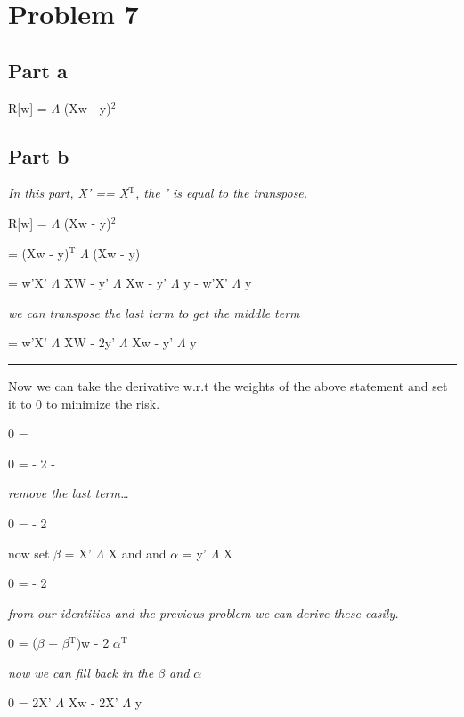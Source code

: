\documentclass[11pt]{article}
\begin{document}
\section{Problem 7}
\label{sec-7}
\subsection{Part a}
\label{sec-7-1}

R[w] = $\Lambda$ (Xw - y)$^{\text{2}}$

\subsection{Part b}
\label{sec-7-2}
\emph{In this part, X' == X$^{\text{T}}$, the ' is equal to the transpose.}

R[w] = $\Lambda$ (Xw - y)$^{\text{2}}$

= (Xw - y)$^{\text{T}}$ $\Lambda$ (Xw - y)

= w'X' $\Lambda$ XW - y' $\Lambda$ Xw - y' $\Lambda$ y - w'X' $\Lambda$ y

\emph{we can transpose the last term to get the middle term}

= w'X' $\Lambda$ XW - 2y' $\Lambda$ Xw - y' $\Lambda$ y

\rule{\linewidth}{0.5pt}
Now we can take the derivative w.r.t the weights of the above statement and set it to 0 to minimize the risk.

0 = 

0 =  - 2  - 

\emph{remove the last term\ldots{}}

0 =  - 2 

now set $\beta$ = X' $\Lambda$ X and and $\alpha$ = y' $\Lambda$ X

0 =  - 2 

\emph{from our identities and the previous problem we can derive these easily.}

0 = ($\beta$ + $\beta$$^{\text{T}}$)w  - 2 $\alpha$$^{\text{T}}$

\emph{now we can fill back in the $\beta$ and $\alpha$}

0 = 2X' $\Lambda$ Xw - 2X' $\Lambda$ y
\end{document}
